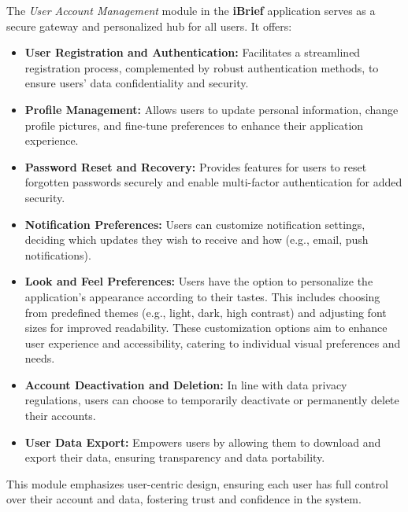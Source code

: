 The \textit{User Account Management} module in the \textbf{iBrief} application serves as a secure gateway and personalized hub for all users. It offers:

\begin{itemize}
    \item \textbf{User Registration and Authentication:}
    Facilitates a streamlined registration process, complemented by robust authentication methods, to ensure users' data confidentiality and security.
    
    \item \textbf{Profile Management:}
    Allows users to update personal information, change profile pictures, and fine-tune preferences to enhance their application experience.
    
    \item \textbf{Password Reset and Recovery:}
    Provides features for users to reset forgotten passwords securely and enable multi-factor authentication for added security.
    
    \item \textbf{Notification Preferences:}
    Users can customize notification settings, deciding which updates they wish to receive and how (e.g., email, push notifications).

    \item \textbf{Look and Feel Preferences:}
    Users have the option to personalize the application's appearance according to their tastes. This includes choosing from predefined themes (e.g., light, dark, high contrast) and adjusting font sizes for improved readability. These customization options aim to enhance user experience and accessibility, catering to individual visual preferences and needs.
    
    \item \textbf{Account Deactivation and Deletion:}
    In line with data privacy regulations, users can choose to temporarily deactivate or permanently delete their accounts.
    
    \item \textbf{User Data Export:}
    Empowers users by allowing them to download and export their data, ensuring transparency and data portability.
\end{itemize}

This module emphasizes user-centric design, ensuring each user has full control over their account and data, fostering trust and confidence in the system.


